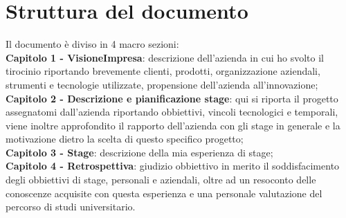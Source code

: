 \newpage

\chapter*{Struttura del documento}
Il documento è diviso in 4 macro sezioni:\\
\textbf{Capitolo 1 - VisioneImpresa}: descrizione dell'azienda in cui ho svolto il tirocinio riportando brevemente clienti, prodotti, organizzazione aziendali, strumenti e 
tecnologie utilizzate, propensione dell'azienda all'innovazione;\\
\textbf{Capitolo 2 - Descrizione e pianificazione stage}: qui si riporta il progetto assegnatomi dall'azienda riportando obbiettivi, vincoli tecnologici e temporali, viene 
inoltre approfondito il rapporto dell'azienda con gli stage in generale e la motivazione dietro la scelta di questo specifico progetto;\\
\textbf{Capitolo 3 - Stage}: descrizione della mia esperienza di stage;\\
\textbf{Capitolo 4 - Retrospettiva}: giudizio obbiettivo in merito il soddisfacimento degli obbiettivi di stage, personali e aziendali, oltre 
ad un resoconto delle conoscenze acquisite con questa esperienza e una personale valutazione del percorso di studi universitario.


\endgroup
\vfill

